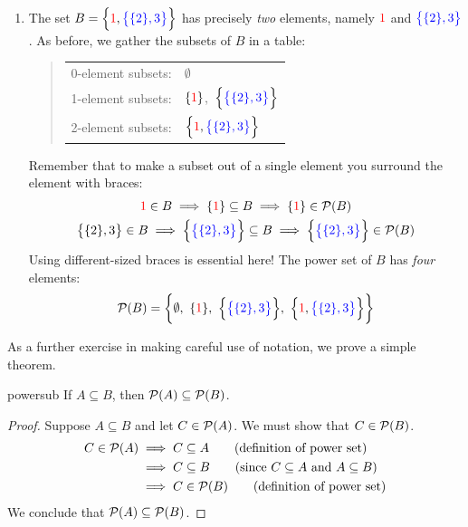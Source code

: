 \begin{examples}{}{}
\begin{enumerate}
	  \item The set $B=\Bigl\{\textcolor{red}{1},\textcolor{blue}{\bigl\{\{2\},3\bigr\}}\Bigr\}$ has precisely \emph{two} elements, namely $\textcolor{red}{1}$ and $\textcolor{blue}{\bigl\{\{2\},3\bigr\}}$. As before, we gather the subsets of $B$ in a table:
	  \begin{quote}
			\begin{tabular}{@{}ll}
				0-element subsets:&$\emptyset$\\
				1-element subsets:&$\{\textcolor{red}{1}\}$,\ $\Bigl\{\textcolor{blue}{\bigl\{\{2\},3\bigr\}}\Bigr\}$\\
				2-element subsets:&$\Bigl\{\textcolor{red}{1},\textcolor{blue}{\bigl\{\{2\},3\bigr\}}\Bigr\}$
			\end{tabular}
		\end{quote}
		Remember that to make a subset out of a single element you surround the element with braces:
		\begin{gather*}
			\textcolor{red}{1}\in B\implies \{\textcolor{red}{1}\}\subseteq B\implies \{\textcolor{red}{1}\}\in\mathcal{P}(B)\\
			\bigl\{\{2\},3\bigr\}\in B\implies \Bigl\{\textcolor{blue}{\bigl\{\{2\},3\bigr\}}\Bigr\}\subseteq B \implies \Bigl\{\textcolor{blue}{\bigl\{\{2\},3\bigr\}}\Bigr\} \in\mathcal{P}(B)
		\end{gather*}
		Using different-sized braces is essential here! The power set of $B$ has \emph{four} elements:
		\[
			\cP(B)=\biggl\{\emptyset,\ \{\textcolor{red}{1}\},\ \Bigl\{\textcolor{blue}{\bigl\{\{2\},3\bigr\}}\Bigr\},\ \Bigl\{\textcolor{red}{1},\textcolor{blue}{\bigl\{\{2\},3\bigr\}}\Bigr\} \biggr\}
		\]
	\end{enumerate}
\end{examples}


\goodbreak

As a further exercise in making careful use of notation, we prove a simple theorem.

\begin{thm}{}{powersub}
	If $A\subseteq B$, then $\mathcal{P}(A)\subseteq\mathcal{P}(B)$.
\end{thm}

\begin{proof}
	Suppose $A\subseteq B$ and let $C\in\mathcal{P}(A)$. We must show that $C\in\mathcal{P}(B)$.
	\begin{align*}
		C\in\mathcal{P}(A)&\implies C\subseteq A \tag{definition of power set}\\
		&\implies C\subseteq B \tag{since $C\subseteq A$ and $A\subseteq B$}\\
		&\implies C\in\mathcal{P}(B) \tag{definition of power set}
	\end{align*}
	We conclude that $\mathcal{P}(A)\subseteq\mathcal{P}(B)$.
\end{proof}


